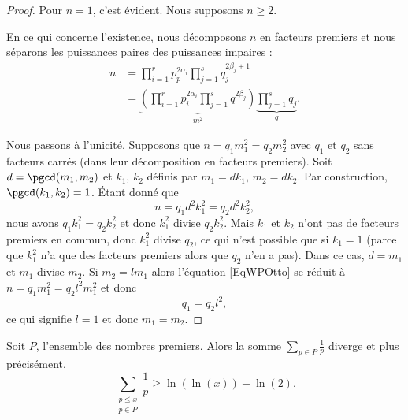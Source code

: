 \begin{proof}
    Pour \( n=1\), c'est évident. Nous supposons \( n\geq 2\).

    En ce qui concerne l'existence, nous décomposons \( n\) en facteurs premiers et nous séparons les puissances paires des puissances impaires :
    \begin{subequations}
        \begin{align}
            n&=\prod_{i=1}^rp_p^{2\alpha_i}\prod_{j=1}^sq_{j}^{2\beta_j+1}\\
            &=\underbrace{\left( \prod_{i=1}^rp_i^{2\alpha_i}\prod_{j=1}^sq^{2\beta_j} \right)}_{m^2}\underbrace{\prod_{j=1}^sq_j}_{q}.
        \end{align}
    \end{subequations}
    
    Nous passons à l'unicité. Supposons que \( n=q_1m_1^2=q_2m_2^2\) avec \( q_1\) et \( q_2\) sans facteurs carrés (dans leur décomposition en facteurs premiers). Soit \( d=\pgcd(m_1,m_2)\) et \( k_1\), \( k_2\) définis par \( m_1=dk_1\), \( m_2=dk_2\). Par construction, \( \pgcd(k_1,k_2)=1\). Étant donné que
    \begin{equation}        \label{EqWPOtto}
        n=q_1d^2k_1^2=q_2d^2k_2^2,
    \end{equation}
    nous avons \( q_1k_1^2=q_2k_2^2\) et donc \( k_1^2\) divise \( q_2k_2^2\). Mais \( k_1\) et \( k_2\) n'ont pas de facteurs premiers en commun, donc \( k_1^2\) divise \( q_2\), ce qui n'est possible que si \( k_1=1\) (parce que \( k_1^2\) n'a que des facteurs premiers alors que \( q_2\) n'en a pas). Dans ce cas, \( d=m_1\) et \( m_1\) divise \( m_2\). Si \( m_2=lm_1\) alors l'équation \eqref{EqWPOtto} se réduit à  \( n=q_1m_1^2=q_2l^2m_1^2\) et donc
    \begin{equation}
        q_1=q_2l^2,
    \end{equation}
    ce qui signifie \( l=1\) et donc \( m_1=m_2\).

\end{proof}

\begin{theorem} \label{ThonfVruT}
    Soit \( P\), l'ensemble des nombres premiers. Alors la somme \( \sum_{p\in P}\frac{1}{ p }\) diverge et plus précisément,
    \begin{equation}
        \sum_{\substack{p\leq x\\p\in P}}\frac{1}{ p }\geq \ln(\ln(x))-\ln(2).
    \end{equation}
\end{theorem}

